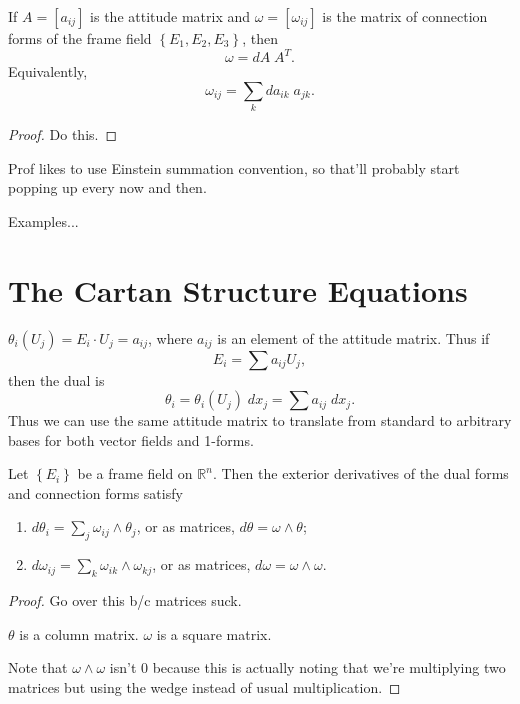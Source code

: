 \documentclass[10pt]{report}
\begin{document}
\begin{thrm}[]
	If $A=[a_{ij}]$ is the attitude matrix and $\omega=[\omega_{ij}]$ is the matrix of connection forms of the frame field $\left\{ E_1,E_2,E_3 \right\}$, then
	\[
	\omega = dA \; A^T.
	\] 
	Equivalently,
	\[
	\omega_{ij} = \sum_k da_{ik}\;a_{jk}.
	\] 
\end{thrm}
\begin{proof}
	{\color{red}Do this.}
\end{proof}

\begin{note}[]
Prof likes to use Einstein summation convention, so that'll probably start popping up every now and then.
\end{note}

{\color{red}Examples...}


\section{The Cartan Structure Equations}

\begin{ex}[]
	$\theta_i(U_j) = E_i \cdot U_j=a_{ij}$, where $a_{ij}$ is an element of the attitude matrix. Thus if
	\[
	E_i = \sum a_{ij}U_j,
	\] then the dual is
	\[
		\theta_i = \theta_i(U_j) \;dx_j=\sum a_{ij}\;dx_j.
	\] Thus we can use the same attitude matrix to translate from standard to arbitrary bases for both vector fields and 1-forms.
\end{ex}

\begin{thrm}
	Let $\left\{ E_i \right\}$ be a frame field on $\mathbb{R}^n$. Then the exterior derivatives of the dual forms and connection forms satisfy
\begin{enumerate}
	\item $d\theta_i = \sum_j \omega_{ij}\wedge \theta_j$, or as matrices, $d\theta=\omega\wedge\theta$;
	\item $d\omega_{ij}=\sum_k \omega_{ik}\wedge\omega_{kj}$, or as matrices, $d\omega=\omega\wedge\omega$.
\end{enumerate}
\end{thrm}
\begin{proof}
	{\color{red}Go over this b/c matrices suck.}

	{\color{red}$\theta$ is a column matrix. $\omega$ is a square matrix.}

	{\color{red}Note that $\omega\wedge\omega$ isn't 0 because this is actually noting that we're multiplying two matrices but using the wedge instead of usual multiplication.}
\end{proof}
\end{document}
